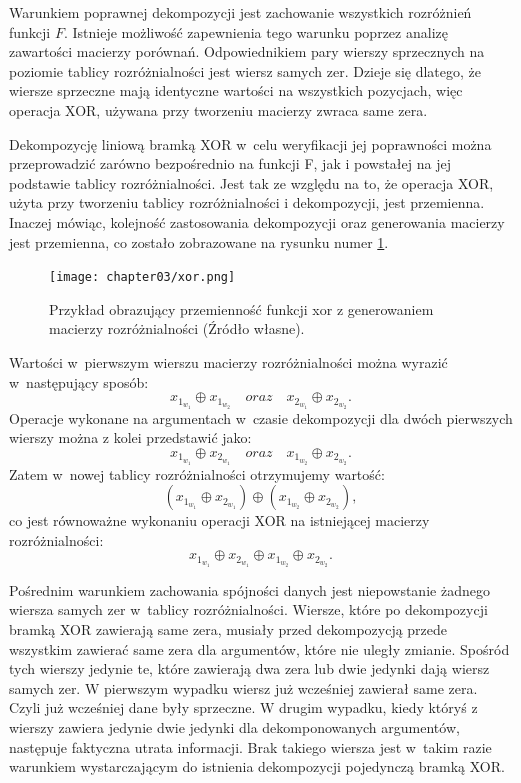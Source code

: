 Warunkiem poprawnej dekompozycji jest zachowanie wszystkich rozróżnień funkcji $F$.
Istnieje możliwość zapewnienia tego warunku poprzez analizę zawartości macierzy porównań.
Odpowiednikiem pary wierszy sprzecznych na poziomie tablicy rozróżnialności jest wiersz samych zer.
Dzieje się dlatego,
że wiersze sprzeczne mają identyczne wartości na wszystkich pozycjach,
więc operacja XOR,
używana przy tworzeniu macierzy zwraca same zera.

Dekompozycję liniową bramką XOR w~celu weryfikacji jej poprawności można przeprowadzić zarówno bezpośrednio na funkcji F,
jak i powstałej na jej podstawie tablicy rozróżnialności.
Jest tak ze względu na to,
że operacja XOR,
użyta przy tworzeniu tablicy rozróżnialności i dekompozycji,
jest przemienna.
Inaczej mówiąc,
kolejność zastosowania dekompozycji oraz generowania macierzy jest przemienna,
co zostało zobrazowane na rysunku numer \ref{fig:xor}.

\begin{figure}[H]
\centering
\texttt{[image: chapter03/xor.png]}
\caption{Przykład obrazujący przemienność funkcji xor z generowaniem macierzy rozróżnialności (Źródło własne).}
\label{fig:xor}
\end{figure}

Wartości w~pierwszym wierszu macierzy rozróżnialności można wyrazić w~następujący sposób:
\begin{equation}
x_{1_{w_1}} \oplus x_{1_{w_2}} \quad oraz \quad x_{2_{w_1}} \oplus x_{2_{w_2}}.
\end{equation}
Operacje wykonane na argumentach w~czasie dekompozycji dla dwóch pierwszych wierszy można z kolei przedstawić jako:
\begin{equation}
x_{1_{w_1}} \oplus x_{2_{w_1}} \quad oraz \quad x_{1_{w_2}} \oplus x_{2_{w_2}}.
\end{equation}
Zatem w~nowej tablicy rozróżnialności otrzymujemy wartość:
\begin{equation}
(x_{1_{w_1}} \oplus x_{2_{w_1}}) \oplus (x_{1_{w_2}} \oplus x_{2_{w_2}}),
\end{equation}
 co jest równoważne wykonaniu operacji XOR na istniejącej macierzy rozróżnialności:
\begin{equation}
x_{1_{w_1}} \oplus x_{2_{w_1}} \oplus x_{1_{w_2}} \oplus x_{2_{w_2}}.
\end{equation}

Pośrednim warunkiem zachowania spójności danych jest niepowstanie żadnego wiersza samych zer w~tablicy rozróżnialności.
Wiersze,
które po dekompozycji bramką XOR zawierają same zera,
musiały przed dekompozycją przede wszystkim zawierać same zera dla argumentów,
które nie uległy zmianie.
Spośród tych wierszy jedynie te,
które zawierają dwa zera lub dwie jedynki dają wiersz samych zer.
W pierwszym wypadku wiersz już wcześniej zawierał same zera.
Czyli już wcześniej dane były sprzeczne.
W drugim wypadku,
kiedy któryś z wierszy zawiera jedynie dwie jedynki dla dekomponowanych argumentów,
następuje faktyczna utrata informacji.
Brak takiego wiersza jest w~takim razie warunkiem wystarczającym do istnienia dekompozycji pojedynczą bramką XOR.

